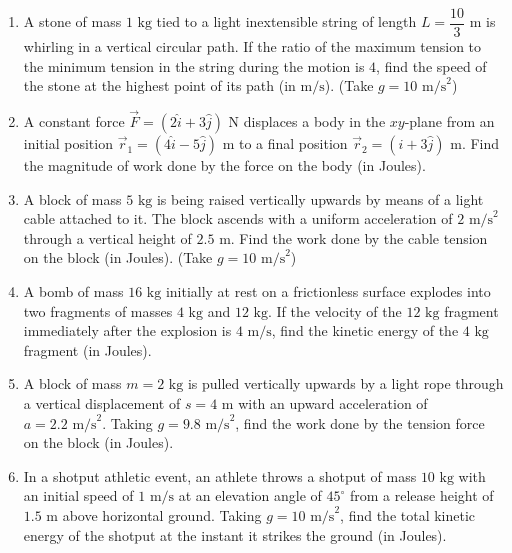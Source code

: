 \documentclass[11pt,a4paper]{article}
\begin{document}
\begin{enumerate}[label=\textbf{\arabic*.},leftmargin=18pt,itemsep=10pt,resume]

  \item A stone of mass $1\text{ kg}$ tied to a light inextensible string of length $L = \dfrac{10}{3}\text{ m}$ is whirling in a vertical circular path. If the ratio of the maximum tension to the minimum tension in the string during the motion is $4$, find the speed of the stone at the highest point of its path (in $\text{m/s}$). (Take $g = 10\text{ m/s}^2$)

  \item A constant force $\vec{F} = (2\hat{i} + 3\hat{j})\text{ N}$ displaces a body in the $xy$-plane from an initial position $\vec{r}_1 = (4\hat{i} - 5\hat{j})\text{ m}$ to a final position $\vec{r}_2 = (\hat{i} + 3\hat{j})\text{ m}$. Find the magnitude of work done by the force on the body (in Joules).

  \item A block of mass $5\text{ kg}$ is being raised vertically upwards by means of a light cable attached to it. The block ascends with a uniform acceleration of $2\text{ m/s}^2$ through a vertical height of $2.5\text{ m}$. Find the work done by the cable tension on the block (in Joules). (Take $g = 10\text{ m/s}^2$)

  \item A bomb of mass $16\text{ kg}$ initially at rest on a frictionless surface explodes into two fragments of masses $4\text{ kg}$ and $12\text{ kg}$. If the velocity of the $12\text{ kg}$ fragment immediately after the explosion is $4\text{ m/s}$, find the kinetic energy of the $4\text{ kg}$ fragment (in Joules).

  \item A block of mass $m = 2\text{ kg}$ is pulled vertically upwards by a light rope through a vertical displacement of $s = 4\text{ m}$ with an upward acceleration of $a = 2.2\text{ m/s}^2$. Taking $g = 9.8\text{ m/s}^2$, find the work done by the tension force on the block (in Joules).

  \item In a shotput athletic event, an athlete throws a shotput of mass $10\text{ kg}$ with an initial speed of $1\text{ m/s}$ at an elevation angle of $45^\circ$ from a release height of $1.5\text{ m}$ above horizontal ground. Taking $g = 10\text{ m/s}^2$, find the total kinetic energy of the shotput at the instant it strikes the ground (in Joules).

\end{enumerate}
\newpage
\end{document}
